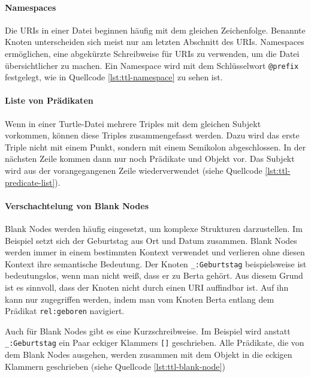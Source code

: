 \paragraph{Namespaces}

Die URIs in einer Datei beginnen häufig mit dem gleichen Zeichenfolge. Benannte Knoten unterscheiden sich meist nur am letzten Abschnitt des URIs. Namespaces ermöglichen, eine abgekürzte Schreibweise für URIs zu verwenden, um die Datei übersichtlicher zu machen. Ein Namespace wird mit dem Schlüsselwort \lstinline|@prefix| festgelegt, wie in Quellcode \ref{lst:ttl-namespace} zu sehen ist.

\paragraph{Liste von Prädikaten}
Wenn in einer Turtle-Datei mehrere Triples mit dem gleichen Subjekt vorkommen, können diese Triples zusammengefasst werden. Dazu wird das erste Triple nicht mit einem Punkt, sondern mit einem Semikolon abgeschlossen. In der nächsten Zeile kommen dann nur noch Prädikate und Objekt vor. Das Subjekt wird aus der vorangegangenen Zeile wiederverwendet (siehe Quellcode \ref{lst:ttl-predicate-list}).

\paragraph{Verschachtelung von Blank Nodes}
Blank Nodes werden häufig eingesetzt, um komplexe Strukturen darzustellen. Im Beispiel setzt sich der Geburtstag aus Ort und Datum zusammen. Blank Nodes werden immer in einem bestimmten Kontext verwendet und verlieren ohne diesen Kontext ihre semantische Bedeutung. Der Knoten \lstinline|_:Geburtstag| beispielsweise ist bedeutungslos, wenn man nicht weiß, dass er zu Berta gehört. Aus diesem Grund ist es sinnvoll, dass der Knoten nicht durch einen URI auffindbar ist. Auf ihn kann nur zugegriffen werden, indem man vom Knoten Berta entlang dem Prädikat \lstinline|rel:geboren| navigiert.

Auch für Blank Nodes gibt es eine Kurzschreibweise. Im Beispiel wird anstatt \lstinline|_:Geburtstag| ein Paar eckiger Klammers \lstinline|[]| geschrieben. Alle Prädikate, die von dem Blank Nodes ausgehen, werden zusammen mit dem Objekt in die eckigen Klammern geschrieben (siehe Quellcode \ref{lst:ttl-blank-node})


